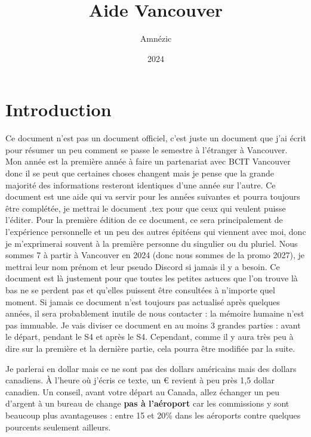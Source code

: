 \documentclass{article}
\author{Amnézic}
\date{2024}
\title{Aide Vancouver}
\begin{document}
\maketitle
\newpage
\tableofcontents
\newpage

\section{Introduction}
Ce document n'est pas un document officiel, c'est juste un document que j'ai écrit pour résumer un peu comment se passe le semestre à l'étranger à Vancouver. Mon année est la première année à faire un partenariat avec BCIT Vancouver donc il se peut que certaines choses changent mais je pense que la grande majorité des informations resteront identiques d'une année sur l'autre.\newline
Ce document est une aide qui va servir pour les années suivantes et pourra toujours être complétée, je mettrai le document .tex pour que ceux qui veulent puisse l'éditer. Pour la première édition de ce document, ce sera principalement de l'expérience personnelle et un peu des autres épitéens qui viennent avec moi, donc je m'exprimerai souvent à la première personne du singulier ou du pluriel.\newline
Nous sommes 7 à partir à Vancouver en 2024 (donc nous sommes de la promo 2027), je mettrai leur nom prénom et leur pseudo Discord si jamais il y a besoin. Ce document est là justement pour que toutes les petites astuces que l'on trouve là bas ne se perdent pas et qu'elles puissent être consultées à n'importe quel moment. Si jamais ce document n'est toujours pas actualisé après quelques années, il sera probablement inutile de nous contacter : la mémoire humaine n'est pas immuable.\newline
Je vais diviser ce document en au moins 3 grandes parties : avant le départ, pendant le S4 et après le S4. Cependant, comme il y aura très peu à dire sur la première et la dernière partie, cela pourra être modifiée par la suite.\newline\newline

Je parlerai en dollar mais ce ne sont pas des dollars américains mais des dollars canadiens. À l'heure où j'écris ce texte, un € revient à peu près 1,5 dollar canadien. Un conseil, avant votre départ au Canada, allez échanger un peu d'argent à un bureau de change \textbf{pas à l'aéroport} car les commissions y sont beaucoup plus avantageuses : entre 15 et 20\% dans les aéroports contre quelques pourcents seulement ailleurs.
\end{document}

